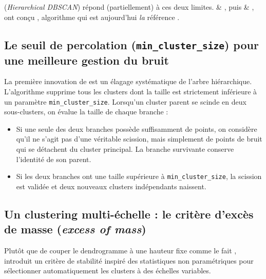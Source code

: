\HDBSCAN (\emph{Hierarchical DBSCAN}) répond (partiellement) à ces deux limites.  \&  \cite{HDBSCAN}, puis  \&  \cite{HDBSCAN2017}, ont conçu \HDBSCAN, algorithme qui est aujourd'hui \emph{la} référence \cite{HDBSCAN2025SOTA, FLASC2025}.



\subsection{Le seuil de percolation (\texttt{min\_cluster\_size}) pour une meilleure gestion du bruit}

La première innovation de \HDBSCAN est un élagage systématique de l'arbre hiérarchique. L'algorithme supprime tous les clusters dont la taille est strictement inférieure à un paramètre \texttt{min\_cluster\_size}. Lorsqu'un cluster parent se scinde en deux sous-clusters, on évalue la taille de chaque branche :
\begin{itemize}
    \item Si une seule des deux branches possède suffisamment de points, on considère qu'il ne s'agit pas d'une véritable scission, mais simplement de points de bruit qui se détachent du cluster principal. La branche survivante conserve l'identité de son parent.
    \item Si les deux branches ont une taille supérieure à \texttt{min\_cluster\_size}, la scission est validée et deux nouveaux clusters indépendants naissent.
\end{itemize}



\subsection{Un clustering multi-échelle : le critère d'excès de masse (\emph{excess of mass})}

Plutôt que de couper le dendrogramme à une hauteur fixe comme le fait \DBSCAN, \HDBSCAN introduit un critère de stabilité inspiré des statistiques non paramétriques \cite{MullerSawitzki} pour sélectionner automatiquement les clusters à des échelles variables.

